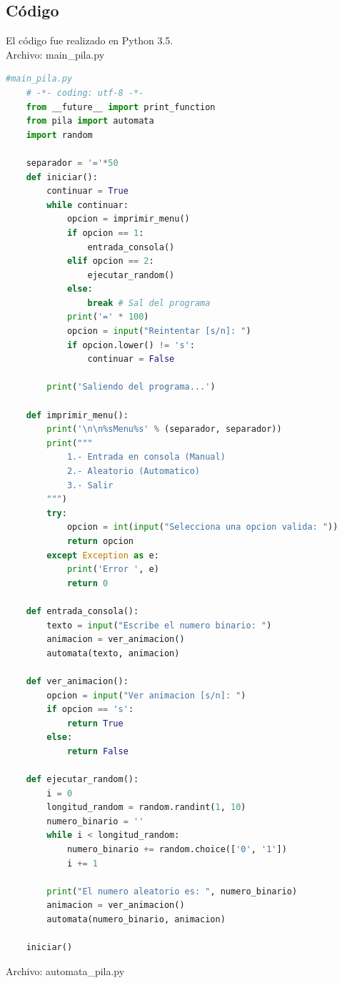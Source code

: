 	\subsection{Código}
	El código fue realizado en Python 3.5.
	\\Archivo: main\_pila.py
	\begin{lstlisting}[language=Python]
	#main_pila.py
	# -*- coding: utf-8 -*-
	from __future__ import print_function
	from pila import automata
	import random

	separador = '='*50
	def iniciar():
	    continuar = True
	    while continuar:
	        opcion = imprimir_menu()
	        if opcion == 1:
	            entrada_consola()
	        elif opcion == 2:
	            ejecutar_random()
	        else:
	            break # Sal del programa
	        print('=' * 100)
	        opcion = input("Reintentar [s/n]: ")
	        if opcion.lower() != 's':
	            continuar = False

	    print('Saliendo del programa...')

	def imprimir_menu():
	    print('\n\n%sMenu%s' % (separador, separador))
	    print("""
	        1.- Entrada en consola (Manual)
	        2.- Aleatorio (Automatico)
	        3.- Salir
	    """)
	    try:
	        opcion = int(input("Selecciona una opcion valida: "))
	        return opcion
	    except Exception as e:
	        print('Error ', e)
	        return 0

	def entrada_consola():
	    texto = input("Escribe el numero binario: ")
	    animacion = ver_animacion()
	    automata(texto, animacion)

	def ver_animacion():
	    opcion = input("Ver animacion [s/n]: ")
	    if opcion == 's':
	        return True
	    else:
	        return False

	def ejecutar_random():
	    i = 0
	    longitud_random = random.randint(1, 10)
	    numero_binario = ''
	    while i < longitud_random:
	        numero_binario += random.choice(['0', '1'])
	        i += 1

	    print("El numero aleatorio es: ", numero_binario)
	    animacion = ver_animacion()
	    automata(numero_binario, animacion)

	iniciar()
	\end{lstlisting}
	Archivo: automata\_pila.py
